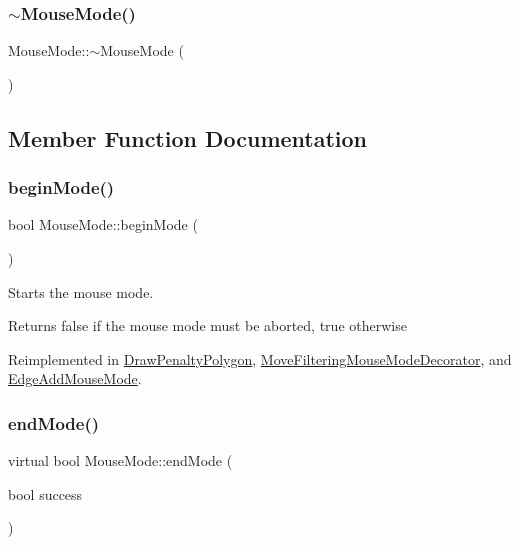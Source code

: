 \subsubsection{\texorpdfstring{$\sim$MouseMode()}{~MouseMode()}}
{\footnotesize\ttfamily Mouse\+Mode\+::$\sim$\+Mouse\+Mode (\begin{DoxyParamCaption}{ }\end{DoxyParamCaption})\hspace{0.3cm}{\ttfamily [virtual]}}



\subsection{Member Function Documentation}
\mbox{\label{class_mouse_mode_a32f232953a46467d2fe636df8907bd74}} 
\subsubsection{\texorpdfstring{beginMode()}{beginMode()}}
{\footnotesize\ttfamily bool Mouse\+Mode\+::begin\+Mode (\begin{DoxyParamCaption}{ }\end{DoxyParamCaption})\hspace{0.3cm}{\ttfamily [virtual]}}



Starts the mouse mode. 

\begin{DoxyReturn}{Returns}
false if the mouse mode must be aborted, true otherwise 
\end{DoxyReturn}


Reimplemented in \mbox{\hyperlink{class_draw_penalty_polygon_aec0762e3c07b40959a01253ca081a34b}{Draw\+Penalty\+Polygon}}, \mbox{\hyperlink{class_move_filtering_mouse_mode_decorator_af24ae14f9b096c26d94ff0e51b716c46}{Move\+Filtering\+Mouse\+Mode\+Decorator}}, and \mbox{\hyperlink{class_edge_add_mouse_mode_aa6b0ad24f42497d75cc97cb2fae82b76}{Edge\+Add\+Mouse\+Mode}}.

\mbox{\label{class_mouse_mode_ad88ebf649b48364a343c86c14513039e}} 
\subsubsection{\texorpdfstring{endMode()}{endMode()}}
{\footnotesize\ttfamily virtual bool Mouse\+Mode\+::end\+Mode (\begin{DoxyParamCaption}\item[{bool}]{success }\end{DoxyParamCaption})\hspace{0.3cm}{\ttfamily [pure virtual]}}




